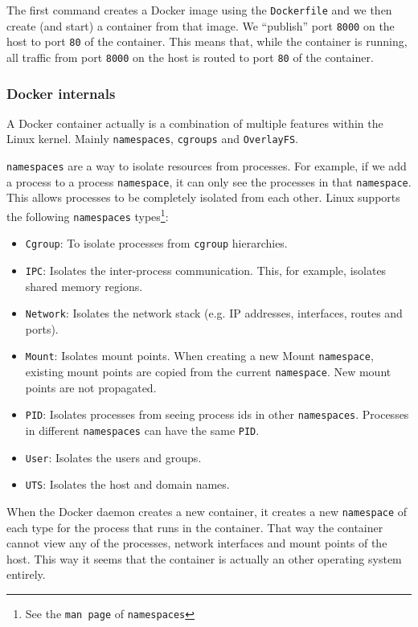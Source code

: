 The first command creates a Docker image using the \lstinline{Dockerfile} and we then create (and start) a container from that image. We ``publish'' port \lstinline{8000} on the host to port \lstinline{80} of the container. This means that, while the container is running, all traffic from port \lstinline{8000} on the host is routed to port \lstinline{80} of the container.

\subsubsection{Docker internals}
A Docker container actually is a combination of multiple features within the Linux kernel.
Mainly \lstinline{namespaces}, \lstinline{cgroups} and \lstinline{OverlayFS}.

\hfill

\lstinline{namespaces} are a way to isolate resources from processes. For example, if we add a process to a process \lstinline{namespace}, it can only see the processes in that \lstinline{namespace}. This allows processes to be completely isolated from each other. Linux supports the following \lstinline{namespaces} types\footnote{See the \lstinline{man page} of \lstinline{namespaces}}:
\begin{itemize}
    \item \lstinline{Cgroup}: To isolate processes from \lstinline{cgroup} hierarchies.
    \item \lstinline{IPC}: Isolates the inter-process communication. This, for example, isolates shared memory regions.
    \item \lstinline{Network}: Isolates the network stack (e.g. IP addresses, interfaces, routes and ports).
    \item \lstinline{Mount}: Isolates mount points. When creating a new Mount \lstinline{namespace}, existing mount points are copied from the current \lstinline{namespace}. New mount points are not propagated.
    \item \lstinline{PID}: Isolates processes from seeing process ids in other \lstinline{namespaces}. Processes in different \lstinline{namespaces} can have the same \lstinline{PID}.
    \item \lstinline{User}: Isolates the users and groups.
    \item \lstinline{UTS}: Isolates the host and domain names.
\end{itemize}

When the Docker daemon creates a new container, it creates a new \lstinline{namespace} of each type for the process that runs in the container. That way the container cannot view any of the processes, network interfaces and mount points of the host. This way it seems that the container is actually an other operating system entirely.

